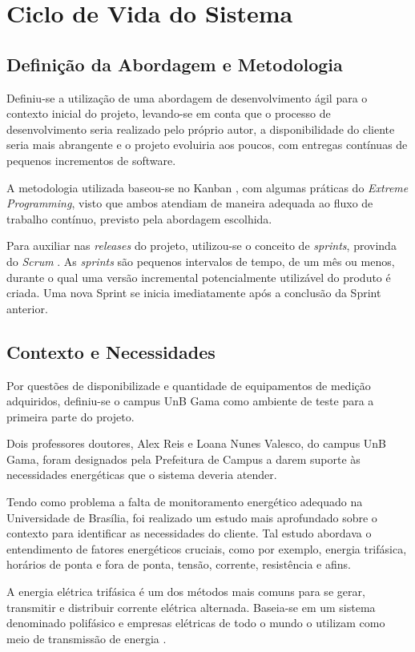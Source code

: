 \chapter{Ciclo de Vida do Sistema}
\section{Definição da Abordagem e Metodologia}
Definiu-se a utilização de uma abordagem de desenvolvimento ágil \cite{beck2001agile} para o contexto inicial do projeto, levando-se em conta que o processo de desenvolvimento seria realizado pelo próprio autor, a disponibilidade do cliente seria mais abrangente e o projeto evoluiria aos poucos, com entregas contínuas de pequenos incrementos de software.

A metodologia utilizada baseou-se no Kanban \cite{radigan_2015}, com algumas práticas do \textit{Extreme Programming}, visto que ambos atendiam de maneira adequada ao fluxo de trabalho contínuo, previsto pela abordagem escolhida.

Para auxiliar nas \textit{releases} do projeto, utilizou-se o conceito de \textit{sprints}, provinda do \textit{Scrum} \cite{scrum_guide}. As \textit{sprints} são pequenos intervalos de tempo, de um mês ou menos, durante o qual uma versão incremental potencialmente utilizável do produto é criada. Uma nova Sprint se inicia imediatamente após a conclusão da Sprint anterior.

\section{Contexto e Necessidades}
Por questões de disponibilizade e quantidade de equipamentos de medição adquiridos, definiu-se o campus UnB Gama como ambiente de teste para a primeira parte do projeto.

Dois professores doutores, Alex Reis e Loana Nunes Valesco, do campus UnB Gama, foram designados pela Prefeitura de Campus a darem suporte às necessidades energéticas que o sistema deveria atender.

Tendo como problema a falta de monitoramento energético adequado na Universidade de Brasília, foi realizado um estudo mais aprofundado sobre o contexto para identificar as necessidades do cliente. Tal estudo abordava o entendimento de fatores energéticos cruciais, como por exemplo, energia trifásica, horários de ponta e fora de ponta, tensão, corrente, resistência e afins.

A energia elétrica trifásica é um dos métodos mais comuns para se gerar, transmitir e distribuir corrente elétrica alternada. Baseia-se em um sistema denominado polifásico e empresas elétricas de todo o mundo o utilizam como meio de transmissão de energia \cite{stevenson_1962}.

